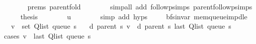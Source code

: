 \begin{isabellebody}
\ \ \ \ \ \ \isamarkupfalse%
\ {\isachardoublequoteopen}{}{\isachardot}{\kern0pt}prems{\isachardoublequoteclose}{\isacharparenleft}{\kern0pt}{}{\isacharparenright}{\kern0pt}\ parent{\isacharunderscore}{\kern0pt}fold\isanewline
\ \ \ \ \ \ \isamarkupfalse%
\ {\isacharparenleft}{\kern0pt}simp{\isacharunderscore}{\kern0pt}all\ add{\isacharcolon}{\kern0pt}\ follow{\isacharunderscore}{\kern0pt}psimps\ parent{\isachardot}{\kern0pt}follow{\isacharunderscore}{\kern0pt}psimps{\isacharparenright}{\kern0pt}\isanewline
\ \ \ \ \isamarkupfalse%
\ {\isacharquery}{\kern0pt}thesis\isanewline
\ \ \ \ \ \ \isamarkupfalse%
\ u\isanewline
\ \ \ \ \ \ \isamarkupfalse%
\ {\isacharparenleft}{\kern0pt}simp\ add{\isacharcolon}{\kern0pt}\ {\isachardoublequoteopen}{}{\isachardot}{\kern0pt}hyps{\isachardoublequoteclose}{\isacharparenright}{\kern0pt}\isanewline
\ \ \isamarkupfalse%
\isanewline
{}\isamarkupfalse%
%
\endisatagproof
{\isafoldproof}%
%
\isadelimproof
\isanewline
%
\endisadelimproof
%
\isadeliminvisible
\isanewline
%
\endisadeliminvisible
%
\isataginvisible
{}\isamarkupfalse%
\ {\isacharparenleft}{\kern0pt}\ bfs{\isacharunderscore}{\kern0pt}invar{\isacharparenright}{\kern0pt}\ mem{\isacharunderscore}{\kern0pt}queue{\isacharunderscore}{\kern0pt}imp{\isacharunderscore}{\kern0pt}d{\isacharunderscore}{\kern0pt}le{\isacharcolon}{\kern0pt}\isanewline
\ \ \ {\isachardoublequoteopen}v\ {\isasymin}\ set\ {\isacharparenleft}{\kern0pt}Q{\isacharunderscore}{\kern0pt}list\ {\isacharparenleft}{\kern0pt}queue\ s{\isacharparenright}{\kern0pt}{\isacharparenright}{\kern0pt}{\isachardoublequoteclose}\isanewline
\ \ \ {\isachardoublequoteopen}d\ {\isacharparenleft}{\kern0pt}parent\ s{\isacharparenright}{\kern0pt}\ v\ {\isasymle}\ d\ {\isacharparenleft}{\kern0pt}parent\ s{\isacharparenright}{\kern0pt}\ {\isacharparenleft}{\kern0pt}last\ {\isacharparenleft}{\kern0pt}Q{\isacharunderscore}{\kern0pt}list\ {\isacharparenleft}{\kern0pt}queue\ s{\isacharparenright}{\kern0pt}{\isacharparenright}{\kern0pt}{\isacharparenright}{\kern0pt}{\isachardoublequoteclose}%
\endisataginvisible
{\isafoldinvisible}%
%
\isadeliminvisible
\isanewline
%
\endisadeliminvisible
%
\isadelimproof
%
\endisadelimproof
%
\isatagproof
{}\isamarkupfalse%
\ {\isacharparenleft}{\kern0pt}cases\ {\isachardoublequoteopen}v\ {\isacharequal}{\kern0pt}\ last\ {\isacharparenleft}{\kern0pt}Q{\isacharunderscore}{\kern0pt}list\ {\isacharparenleft}{\kern0pt}queue\ s{\isacharparenright}{\kern0pt}{\isacharparenright}{\kern0pt}{\isachardoublequoteclose}{\isacharparenright}{\kern0pt}\isanewline

\end{isabellebody}
